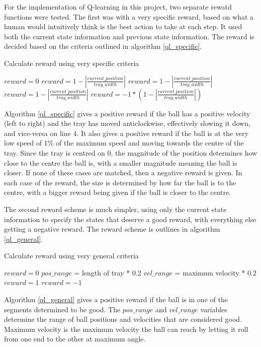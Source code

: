 \documentclass[12pt,a4paper]{article}
\begin{document}
For the implementation of Q-learning in this project, two separate rewatd functions were tested. The first was with a very specific reward, based on what a human would intuitively think is the best action to take at each step. It used both the current state information and previous state information. The reward is decided based on the criteria outlined in algorithm \ref{ql_specific}.
\begin{algorithm}[H]
	\caption{Calculate reward using very specific criteria}
	\label{ql_specific}
	\begin{algorithmic}[1]
		\State $reward = 0$
			\State $reward = 1 - |\frac{current\_position}{tray\_width}|$
			\State $reward = 1 - |\frac{current\_position}{tray\_width}|$
			\State $reward = 1 - |\frac{current\_position}{tray\_width}|$
		\Else 
			\State $reward = -1 * (1 -|\frac{current\_position}{tray\_width}|)$
		\EndIf
	\end{algorithmic}
\end{algorithm}
Algorithm \ref{ql_specific} gives a positive reward if the ball has a positive velocity (left to right) and the tray has moved anticlockwise, effectively slowing it down, and vice-versa on line 4. It also gives a positive reward if the ball is at the very low speed of 1\% of the maximum speed and moving towards the centre of the tray. Since the tray is centred on 0, the magnitude of the position determines how close to the centre the ball is, with a smaller magnitude meaning the ball is closer. If none of these cases are matched, then a negative reward is given. In each case of the reward, the size is determined by how far the ball is to the centre, with a bigger reward being given if the ball is closer to the centre.

The second reward scheme is much simpler, using only the current state information to specify the states that deserve a good reward, with everything else getting a negative reward. The reward scheme is outlines in algorithm \ref{ql_general}.

\begin{algorithm}[H]
	\caption{Calculate reward using very general criteria}
	\label{ql_general}
	\begin{algorithmic}[1]
		\State $reward = 0$
		\State$pos\_range$ = length of tray * 0.2
		\State$vel\_range$ = maximum velocity * 0.2
			\State $reward = 1$
		\Else 
			\State $reward = -1$
		\EndIf
	\end{algorithmic}
\end{algorithm}
Algorithm \ref{ql_general} gives a positive reward if the ball is in one of the segments determined to be good. The $pos\_range$ and $vel\_range$ variables determine the range of ball positions and velocities that are considered good. Maximum velocity is the maximum velocity the ball can reach by letting it roll from one end to the other at maximum angle.
\end{document}

